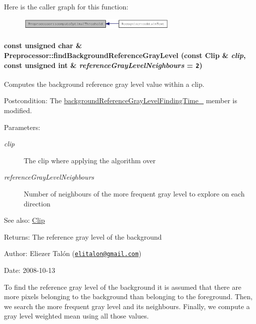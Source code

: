 Here is the caller graph for this function:\nopagebreak
\begin{figure}[H]
\begin{center}
\leavevmode
\includegraphics[width=220pt]{class_preprocessor_ac2f414d6f4f917419f33f6067eb8634_icgraph}
\end{center}
\end{figure}
\hypertarget{class_preprocessor_a941f81382bd8e235e4dd12481342be4}{
\paragraph[{findBackgroundReferenceGrayLevel}]{\setlength{\rightskip}{0pt plus 5cm}const unsigned char \& Preprocessor::findBackgroundReferenceGrayLevel (const {\bf Clip} \& {\em clip}, \/  const unsigned int \& {\em referenceGrayLevelNeighbours} = {\tt 2})}\hfill}
\label{class_preprocessor_a941f81382bd8e235e4dd12481342be4}


Computes the background reference gray level value within a clip. 

\begin{Desc}
\item[Postcondition:]The \hyperlink{class_preprocessor_98ea95388e043eef5460beaf2e3aaaed}{backgroundReferenceGrayLevelFindingTime\_\-} member is modified.\end{Desc}
\begin{Desc}
\item[Parameters:]
\begin{description}
\item[{\em clip}]The clip where applying the algorithm over \item[{\em referenceGrayLevelNeighbours}]Number of neighbours of the more frequent gray level to explore on each direction\end{description}
\end{Desc}
\begin{Desc}
\item[See also:]\hyperlink{class_clip}{Clip}\end{Desc}
\begin{Desc}
\item[Returns:]The reference gray level of the background\end{Desc}
\begin{Desc}
\item[Author:]Eliezer Talón (\href{mailto:elitalon@gmail.com}{\tt elitalon@gmail.com}) \end{Desc}
\begin{Desc}
\item[Date:]2008-10-13\end{Desc}
To find the reference gray level of the background it is assumed that there are more pixels belonging to the background than belonging to the foreground. Then, we search the more frequent gray level and its neighbours. Finally, we compute a gray level weighted mean using all those values.

